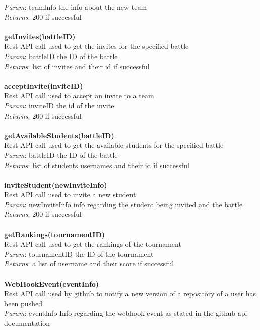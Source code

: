\documentclass{article}
\begin{document}
\textit{Param}: teamInfo the info about the new team\\
\textit{Returns}: 200 if successful\\
\\
\textbf{getInvites(battleID)}\\
Rest API call used to get the invites for the specified battle\\
\textit{Param}: battleID the ID of the battle\\
\textit{Returns}: list of invites and their id if successful\\
\\
\textbf{acceptInvite(inviteID)}\\
Rest API call used to accept an invite to a team\\
\textit{Param}: inviteID the id of the invite\\
\textit{Returns}: 200 if successful\\
\\
\textbf{getAvailableStudents(battleID)}\\
Rest API call used to get the available students for the specified battle\\
\textit{Param}: battleID the ID of the battle\\
\textit{Returns}: list of students usernames and their id if successful\\
\\
\textbf{inviteStudent(newInviteInfo)}\\
Rest API call used to invite a new student\\
\textit{Param}: newInviteInfo info regarding the student being invited and the battle\\
\textit{Returns}: 200 if successful\\
\\
\textbf{getRankings(tournamentID)}\\
Rest API call used to get the rankings of the tournament\\
\textit{Param}: tournamentID the ID of the tournament\\
\textit{Returns}: a list of username and their score if successful\\
\\
\textbf{WebHookEvent(eventInfo)}\\
Rest API call used by github to notify a new version of a repository of a user has been pushed\\
\textit{Param}: eventInfo Info regarding the webhook event as stated in the github api documentation\\
\end{document}
